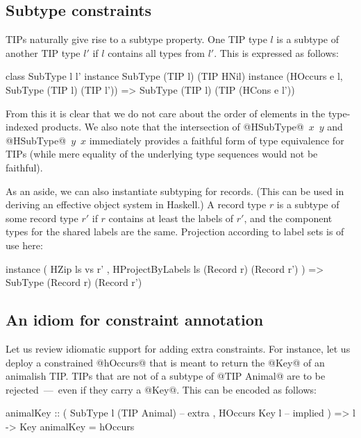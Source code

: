 \documentclass[nocopyrightspace,preprint]{sigplan-proc}
\begin{document}
\medskip

\subsection*{Subtype constraints}

TIPs naturally give rise to a subtype property. One TIP type $l$ is a
subtype of another TIP type $l'$ if $l$ contains all types from
$l'$. This is expressed as follows:

\begin{code}
 class SubType l l'
 instance SubType (TIP l) (TIP HNil)
 instance (HOccurs e l, SubType (TIP l) (TIP l'))
       =>  SubType (TIP l) (TIP (HCons e l'))
\end{code}

From this it is clear that we do not care about the order of elements
in the type-indexed products. We also note that the intersection of
@HSubType@~$x$~$y$ and @HSubType@~$y$~$x$ immediately provides a
faithful form of type equivalence for TIPs (while mere equality of the
underlying type sequences would not be faithful).

As an aside, we can also instantiate subtyping for records. (This can
be used in deriving an effective object system in Haskell.) A record
type $r$ is a subtype of some record type $r'$ if $r$ contains at
least the labels of $r'$, and the component types for the shared
labels are the same. Projection according to label sets is of use
here:
 
\begin{code}
 instance ( HZip ls vs r'
      , HProjectByLabels ls (Record r) (Record r') )
  =>    SubType (Record r) (Record r')
\end{code}


\medskip

\subsection*{An idiom for constraint annotation}

Let us review idiomatic support for adding extra constraints. For
instance, let us deploy a constrained @hOccurs@ that is meant to
return the @Key@ of an animalish TIP. TIPs that are not of a subtype
of
%
@TIP Animal@
%
are to be rejected~---~even if they carry a @Key@. This can be encoded
as follows:

\begin{code}
 animalKey :: ( SubType l (TIP Animal) -- extra
              , HOccurs Key l          -- implied
              ) => l -> Key
 animalKey = hOccurs
\end{code}
\end{document}
